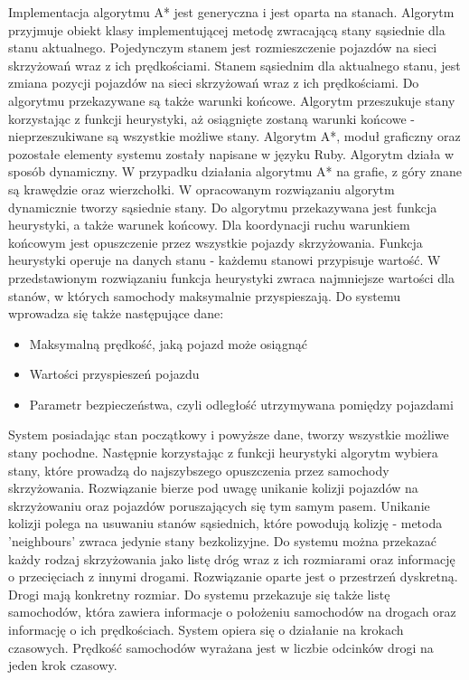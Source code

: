 \newline
\indent 
Implementacja algorytmu A* jest generyczna i jest oparta na stanach. Algorytm przyjmuje obiekt klasy implementującej metodę zwracającą stany sąsiednie dla stanu aktualnego. Pojedynczym stanem jest rozmieszczenie pojazdów na sieci skrzyżowań wraz z ich prędkościami. Stanem sąsiednim dla aktualnego stanu, jest zmiana pozycji pojazdów na sieci skrzyżowań wraz z ich prędkościami. Do algorytmu przekazywane są także warunki końcowe. Algorytm przeszukuje stany korzystając z funkcji heurystyki, aż osiągnięte zostaną warunki końcowe - nieprzeszukiwane są wszystkie możliwe stany. Algorytm A*, moduł graficzny oraz pozostałe elementy systemu zostały napisane w języku Ruby. Algorytm działa w sposób dynamiczny. W przypadku działania algorytmu A* na grafie, z góry znane są krawędzie oraz wierzchołki. W opracowanym rozwiązaniu algorytm dynamicznie tworzy sąsiednie stany.
\newline
\indent
Do algorytmu przekazywana jest funkcja heurystyki, a także warunek końcowy. Dla koordynacji ruchu warunkiem końcowym jest opuszczenie przez wszystkie pojazdy skrzyżowania. Funkcja heurystyki operuje na danych stanu - każdemu stanowi przypisuje wartość. W przedstawionym rozwiązaniu funkcja heurystyki zwraca najmniejsze wartości dla stanów, w których samochody maksymalnie przyspieszają.
\newline
\newline
\noindent
Do systemu wprowadza się także następujące dane:
\begin{itemize}
\item Maksymalną prędkość, jaką pojazd może osiągnąć
\item Wartości przyspieszeń pojazdu
\item Parametr bezpieczeństwa, czyli odległość utrzymywana pomiędzy pojazdami
\end{itemize}
System posiadając stan początkowy i powyższe dane, tworzy wszystkie możliwe stany pochodne. Następnie korzystając z funkcji heurystyki algorytm wybiera stany, które prowadzą do najszybszego opuszczenia przez samochody skrzyżowania.
\newline
\indent
Rozwiązanie bierze pod uwagę unikanie kolizji pojazdów na skrzyżowaniu oraz pojazdów poruszających się tym samym pasem. Unikanie kolizji polega na usuwaniu stanów sąsiednich, które powodują kolizję - metoda 'neighbours' zwraca jedynie stany bezkolizyjne.
\newline
\indent
Do systemu można przekazać każdy rodzaj skrzyżowania jako listę dróg wraz z ich rozmiarami oraz informację o przecięciach z innymi drogami. Rozwiązanie oparte jest o przestrzeń dyskretną. Drogi mają konkretny rozmiar. Do systemu przekazuje się także listę samochodów, która zawiera informacje o położeniu samochodów na drogach oraz informację o ich prędkościach. System opiera się o działanie na krokach czasowych. Prędkość samochodów wyrażana jest w liczbie odcinków drogi na jeden krok czasowy.
